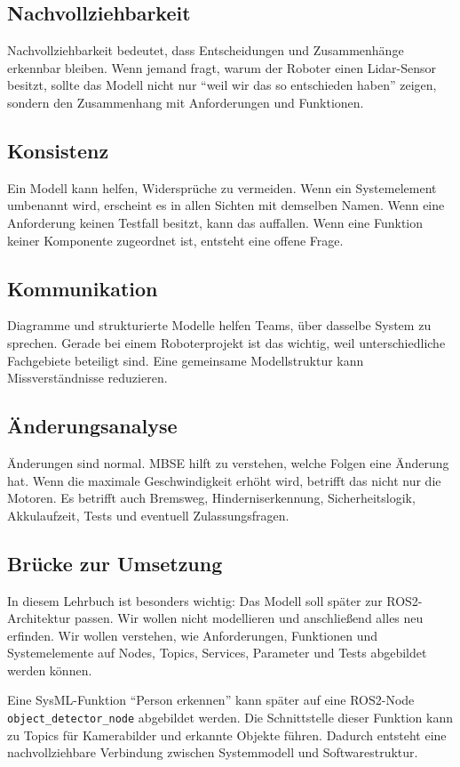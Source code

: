 \subsection{Nachvollziehbarkeit}
Nachvollziehbarkeit bedeutet, dass Entscheidungen und Zusammenhänge erkennbar bleiben. Wenn jemand fragt, warum der Roboter einen Lidar-Sensor besitzt, sollte das Modell nicht nur \enquote{weil wir das so entschieden haben} zeigen, sondern den Zusammenhang mit Anforderungen und Funktionen.

\subsection{Konsistenz}
Ein Modell kann helfen, Widersprüche zu vermeiden. Wenn ein Systemelement umbenannt wird, erscheint es in allen Sichten mit demselben Namen. Wenn eine Anforderung keinen Testfall besitzt, kann das auffallen. Wenn eine Funktion keiner Komponente zugeordnet ist, entsteht eine offene Frage.

\subsection{Kommunikation}
Diagramme und strukturierte Modelle helfen Teams, über dasselbe System zu sprechen. Gerade bei einem Roboterprojekt ist das wichtig, weil unterschiedliche Fachgebiete beteiligt sind. Eine gemeinsame Modellstruktur kann Missverständnisse reduzieren.

\subsection{Änderungsanalyse}
Änderungen sind normal. MBSE hilft zu verstehen, welche Folgen eine Änderung hat. Wenn die maximale Geschwindigkeit erhöht wird, betrifft das nicht nur die Motoren. Es betrifft auch Bremsweg, Hinderniserkennung, Sicherheitslogik, Akkulaufzeit, Tests und eventuell Zulassungsfragen.

\subsection{Brücke zur Umsetzung}
In diesem Lehrbuch ist besonders wichtig: Das Modell soll später zur ROS2-Architektur passen. Wir wollen nicht modellieren und anschließend alles neu erfinden. Wir wollen verstehen, wie Anforderungen, Funktionen und Systemelemente auf Nodes, Topics, Services, Parameter und Tests abgebildet werden können.

\begin{praxisbox}
Eine SysML-Funktion \enquote{Person erkennen} kann später auf eine ROS2-Node \texttt{object\_detector\_node} abgebildet werden. Die Schnittstelle dieser Funktion kann zu Topics für Kamerabilder und erkannte Objekte führen. Dadurch entsteht eine nachvollziehbare Verbindung zwischen Systemmodell und Softwarestruktur.
\end{praxisbox}

